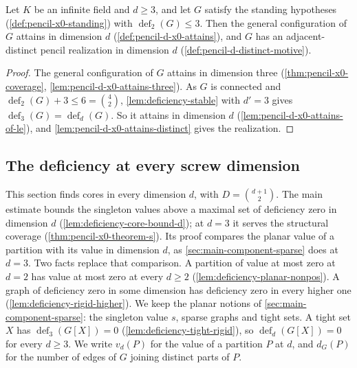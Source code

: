 \begin{theorem}
  \label{thm:pencil-d-deficiency-two-le-three}
  \leanok
  Let $K$ be an infinite field and $d \ge 3$, and let $G$ satisfy the
  standing hypotheses (\cref{def:pencil-x0-standing}) with
  $\operatorname{def}_2(G) \le 3$. Then the general configuration of $G$
  attains in dimension $d$ (\cref{def:pencil-d-x0-attains}), and $G$ has
  an adjacent-distinct pencil realization in dimension $d$
  (\cref{def:pencil-d-distinct-motive}).
\end{theorem}
\begin{proof}
  \leanok
  The general configuration of $G$ attains in dimension three
  (\cref{thm:pencil-x0-coverage}, \cref{lem:pencil-d-x0-attains-three}).
  As $G$ is connected and
  $\operatorname{def}_2(G) + 3 \le 6 = \binom{4}{2}$,
  \cref{lem:deficiency-stable} with $d' = 3$ gives
  $\operatorname{def}_3(G) = \operatorname{def}_d(G)$. So it attains in dimension $d$
  (\cref{lem:pencil-d-x0-attains-of-le}), and
  \cref{lem:pencil-d-x0-attains-distinct} gives the realization.
\end{proof}

\subsection{The deficiency at every screw dimension}
\label{sec:pencil-d-deficiency}

This section finds cores in every dimension $d$, with
$D = \binom{d+1}{2}$. The main estimate bounds the singleton values above
a maximal set of deficiency zero in dimension $d$
(\cref{lem:deficiency-core-bound-d}); at $d = 3$ it serves the
structural coverage (\cref{thm:pencil-x0-theorem-s}). Its proof compares
the planar value of a partition with its value in dimension $d$, as
\cref{sec:main-component-sparse} does at $d = 3$. Two facts replace that
comparison. A partition of value at most zero at $d = 2$ has value at
most zero at every $d \ge 2$ (\cref{lem:deficiency-planar-nonpos}). A
graph of deficiency zero in some dimension has deficiency zero in every
higher one (\cref{lem:deficiency-rigid-higher}). We keep the planar notions of
\cref{sec:main-component-sparse}: the singleton value $s$, sparse graphs
and tight sets. A tight set $X$ has $\operatorname{def}_3(G[X]) = 0$
(\cref{lem:deficiency-tight-rigid}), so $\operatorname{def}_d(G[X]) = 0$
for every $d \ge 3$. We write $v_d(P)$ for the value of a partition $P$ at
$d$, and $d_G(P)$ for the number of edges of $G$ joining distinct parts
of $P$.

